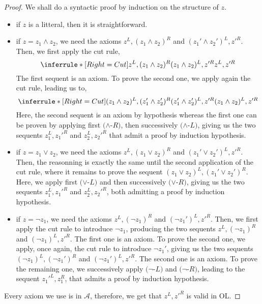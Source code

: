 \documentclass[a4paper, 11pt]{article}
\begin{document}
    \begin{proof}
	    We shall do a syntactic proof by induction on the structure of $z$.
	    \begin{itemize}
		    \item
			    if $z$ is a litteral, then it is straightforward.
		    \item
			    if $z=z_1\wedge z_2$, we need the axioms
			    $z^L,(z_1\wedge z_2)^R$ and $(z_1'\wedge z_2')^L,z'^R$. Then, we first 
			    apply the cut rule,
			    \[
				\inferrule*[Right=Cut]
				{z^L,(z_1\wedge z_2)^R\\(z_1\wedge z_2)^L,z'^R}
				{z^L,z'^R}
			    \]
			    The first sequent is an axiom. To prove 
			    the second one, we apply again the cut rule, leading us to,
			    \[
				\inferrule*[Right=Cut]
				{(z_1\wedge z_2)^L,(z_1'\wedge z_2')^R\\(z_1'\wedge z_2')^L,z'^R}
				{(z_1\wedge z_2)^L,z'^R}
			    \]
			    Here, the second sequent is an axiom by hypothesis whereas the first one 
			    can be proven by applying
			    first $(\wedge$-$R)$, then successively $(\wedge$-$L)$, giving us the two
			    sequents $z_1^L,z_1'^R$ and $z_2^L,z_2'^R$ that admit a proof by
			    induction hypothesis.
		    \item
			    if $z=z_1\vee z_2$, we need the axioms $z^L,(z_1\vee z_2)^R$ and 
			    $(z_1'\vee z_2')^L,z'^R$.
			    Then, the reasonning is exactly the same until the second 
			    application of the cut rule, where it remains to prove the sequent 
			    $(z_1\vee z_2)^L,(z_1'\vee z_2')^R$. Here, we apply first $(\vee$-$L)$ and 
			    then
			    successively $(\vee$-$R)$, giving us the two sequents $z_1^L,z_1'^R$ and
			    $z_2^L,z_2'^R$, both admitting a proof by induction hypothesis.
		    \item
			    if $z=\neg z_1$, we need the axioms $z^L,(\neg z_1)^R$ and 
			    $(\neg z_1')^L,z'^R$. 
			    Then, we first apply the cut rule to introduce $\neg z_1$,
			    producing the two sequents $z^L,(\neg z_1)^R$ and $(\neg z_1)^L,z'^R$.
			    The first one is an axiom. To prove the second one, we apply, once again,
			    the cut rule to introduce $\neg z_1'$, giving us the two sequents
			    $(\neg z_1)^L,(\neg z_1')^R$ and $(\neg z_1')^L,z'^R$. The second one is an 
			    axiom. To
			    prove the remaining one, we successively apply $(\neg$-$L)$ and $(\neg$-$R)$,
			    leading to the sequent $z_1'^L,z_1^R$, that admits a proof by induction
			    hypothesis.
	    \end{itemize}
	    Every axiom we use is in $\mathcal{A}$, therefore, we get that $z^L,z'^R$ is valid in OL.
    \end{proof}
\end{document}
